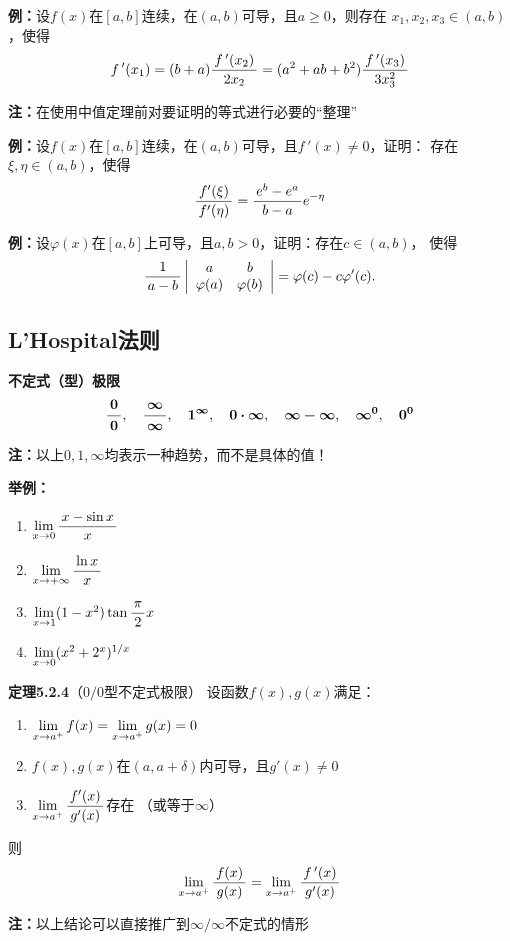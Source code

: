 {\bf 例：}设$f(x)$在$[a,b]$连续，在$(a,b)$可导，且$a\geq 0$，则存在
$x_1,x_2,x_3\in(a,b)$，使得
$$f\,'(x_1)=(b+a)\displaystyle\frac{\,{f\,'(x_2)}\,}{\,{2x_2}\,}=(a^2+ab+b^2)\displaystyle\frac{\,{f\,'(x_3)}\,}{\,{3x_3^2}\,}$$

{\bf 注：}在使用中值定理前对要证明的等式进行必要的“整理”

{\bf 例：}设$f(x)$在$[a,b]$连续，在$(a,b)$可导，且$f\,'(x)\ne 0$，证明：
存在$\xi,\eta\in(a,b)$，使得
$$\displaystyle\frac{\,{f'(\xi)}\,}{\,{f'(\eta)}\,}=\displaystyle\frac{\,{e^b-e^a}\,}{\,{b-a}\,}e^{-\eta}$$

{\bf 例：}设$\varphi(x)$在$[a,b]$上可导，且$a,b>0$，证明：存在$c\in(a,b)$，
使得
$$\displaystyle\frac{\,{1}\,}{\,{a-b}\,}\left|\begin{array}{cc}
a & b\\ \varphi(a) & \varphi(b)
\end{array}\right|=\varphi(c)-c\varphi'(c).$$

\subsection{L'Hospital法则}

{\bf 不定式（型）极限}
$$\bm{\displaystyle\frac{\,{0}\,}{\,{0}\,}}, \quad \bm{\displaystyle\frac{\,{\infty}\,}{\,{\infty}\,}}, \quad
\bm{1^{\infty}}, \quad \bm{0\cdot\infty}, \quad
\bm{\infty-\infty}, \quad \bm{\infty^0}, \bm{\quad 0^0}$$

{\bf 注：}以上$0,1,\infty$均表示一种趋势，而不是具体的值！

{\bf 举例：}
\begin{enumerate}[(1)]
  \setlength{\itemindent}{1cm}
  \item $\lim\limits_{x\to{0}}\displaystyle\frac{\,{x-\sin x}\,}{\,{x}\,}$ 
  \item $\lim\limits_{x\to{+\infty}}\displaystyle\frac{\,{\ln x}\,}{\,{x}\,}$ 
  \item $\lim\limits_{x\to{1}}(1-x^2)\tan\displaystyle\frac{\,{\pi}\,}{\,{2}\,}x$ 
  \item $\lim\limits_{x\to{0}}(x^2+2^x)^{1/x}$
\end{enumerate}

{\bf 定理5.2.4}（$0/0$型不定式极限）
设函数$f(x),g(x)$满足： 
\begin{enumerate}[(1)]
  \setlength{\itemindent}{1cm}
  \item $\lim\limits_{x\to{a^+}}f(x)=\lim\limits_{x\to{a^+}}g(x)=0$ 
  \item $f(x),g(x)$在$(a,a+\delta)$内可导，且$g'(x)\ne 0$ 
  \item $\lim\limits_{x\to{a^+}}\displaystyle\frac{\,{f'(x)}\,}{\,{g'(x)}\,}$存在 （或等于$\infty$） 
\end{enumerate}
则
$$\lim\limits_{x\to{a^+}}\displaystyle\frac{\,{f(x)}\,}{\,{g(x)}\,}=\lim\limits_{x\to{a^+}}\displaystyle\frac{\,{f\,'(x)}\,}{\,{g'(x)}\,}$$

{\bf 注：}以上结论可以直接推广到$\infty/\infty$不定式的情形

